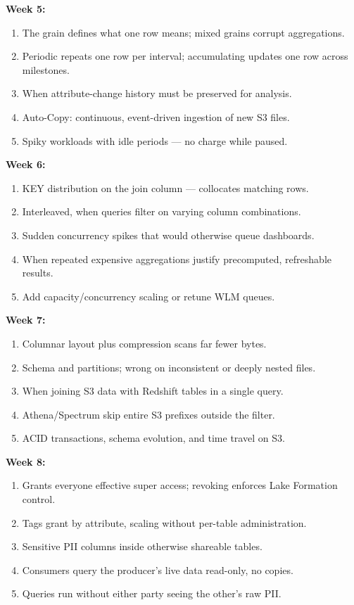 \documentclass[11pt, a4paper]{article}
\begin{document}
\noindent\textbf{Week 5:}
\begin{enumerate}[itemsep=0pt, leftmargin=2em]
    \item The grain defines what one row means; mixed grains corrupt aggregations.
    \item Periodic repeats one row per interval; accumulating updates one row across milestones.
    \item When attribute-change history must be preserved for analysis.
    \item Auto-Copy: continuous, event-driven ingestion of new S3 files.
    \item Spiky workloads with idle periods --- no charge while paused.
\end{enumerate}
\noindent\textbf{Week 6:}
\begin{enumerate}[itemsep=0pt, leftmargin=2em]
    \item KEY distribution on the join column --- collocates matching rows.
    \item Interleaved, when queries filter on varying column combinations.
    \item Sudden concurrency spikes that would otherwise queue dashboards.
    \item When repeated expensive aggregations justify precomputed, refreshable results.
    \item Add capacity/concurrency scaling or retune WLM queues.
\end{enumerate}
\noindent\textbf{Week 7:}
\begin{enumerate}[itemsep=0pt, leftmargin=2em]
    \item Columnar layout plus compression scans far fewer bytes.
    \item Schema and partitions; wrong on inconsistent or deeply nested files.
    \item When joining S3 data with Redshift tables in a single query.
    \item Athena/Spectrum skip entire S3 prefixes outside the filter.
    \item ACID transactions, schema evolution, and time travel on S3.
\end{enumerate}
\noindent\textbf{Week 8:}
\begin{enumerate}[itemsep=0pt, leftmargin=2em]
    \item Grants everyone effective super access; revoking enforces Lake Formation control.
    \item Tags grant by attribute, scaling without per-table administration.
    \item Sensitive PII columns inside otherwise shareable tables.
    \item Consumers query the producer's live data read-only, no copies.
    \item Queries run without either party seeing the other's raw PII.
\end{enumerate}
\end{document}
